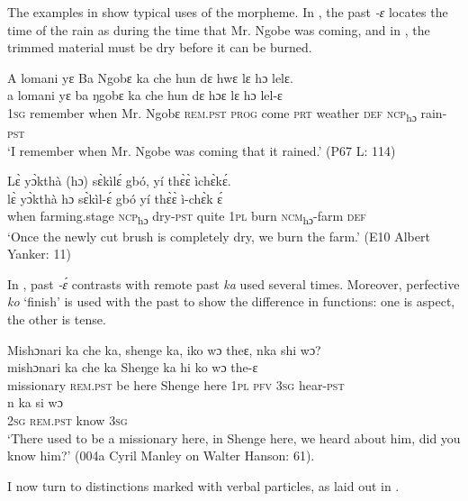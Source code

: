 The examples in  show typical uses of the morpheme. In , the past \textit{{}-ɛ} locates the time of the rain as during the time that Mr. Ngobe was coming, and in , the trimmed material must be dry before it can be burned.

\ea%
    \label{ex:119}
    \ea \label{ex:119a} A lomani yɛ Ba Ngobɛ ka che hun dɛ hwɛ lɛ hɔ  lelɛ.\\
    \gll a    lomani    yɛ      ba    ŋgobɛ  ka      che  hun  dɛ    hɔɛ    lɛ    hɔ      lel-ɛ\\
    \textsc{1sg}  remember  when    Mr.  Ngobɛ  \textsc{rem.pst}  \textsc{prog}  come  \textsc{prt}  weather  \textsc{def}  \textsc{ncp}\textsubscript{hɔ}    rain-\textsc{pst}\\
    \glt ‘I remember when Mr. Ngobe was coming that it rained.' (P67 L: 114)

    \ex \label{ex:119b} Lɛ̀ yɔ̀kthà (hɔ) sɛ̀kìlɛ́ gbó, yí thɛ̀ɛ̀ ìchɛ̀kɛ́.\\
    \gll lɛ̀    yɔ̀kthà      hɔ      sɛ̀kìl-ɛ́  gbó  yí    thɛ̀ɛ̀  ì-chɛ̀k    ɛ́\\
    when  farming.stage  \textsc{ncp}\textsubscript{hɔ}    dry-\textsc{pst}  quite  \textsc{1pl}  burn  \textsc{ncm}\textsubscript{hɔ}{}-farm  \textsc{def}\\
    \glt ‘Once the newly cut brush is completely dry, we burn the farm.' (E10 Albert Yanker: 11)
\z
\z

In , past \textit{{}-ɛ́} contrasts with remote past \textit{ka} used several times. Moreover, perfective \textit{ko} ‘finish' is used with the past to show the difference in functions: one is aspect, the other is tense.

\ea%
    \label{ex:120}
    \ea Mishɔnari ka che ka, shenge ka, iko wɔ theɛ, nka shi wɔ?\\
    \gll mishɔnari  ka      che  ka    Sheŋge  ka    hi    ko    wɔ    the-ɛ\\
    missionary  \textsc{rem.pst}  be    here  Shenge  here  \textsc{1pl}  \textsc{pfv}  \textsc{3sg}  hear\textsc{{}-pst}\\
    \gll n    ka        si      wɔ\\
    \textsc{2sg}  \textsc{rem.pst}    know    \textsc{3sg}\\
    \glt ‘There used to be a missionary here, in Shenge here, we heard about him, did you know him?' (004a Cyril Manley on Walter Hanson: 61).
\z
\z

I now turn to distinctions marked with verbal particles, as laid out in .

